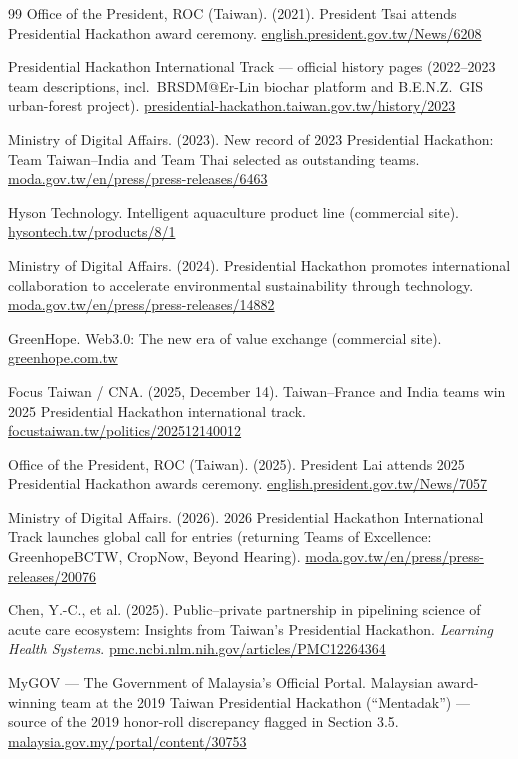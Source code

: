 \begin{thebibliography}{99}
 Office of the President, ROC (Taiwan). (2021). President
Tsai attends Presidential Hackathon award ceremony.
\href{https://english.president.gov.tw/News/6208}{english.president.gov.tw/News/6208}

 Presidential Hackathon International Track --- official
history pages (2022--2023 team descriptions, incl.\ BRSDM@Er-Lin biochar
platform and B.E.N.Z.\ GIS urban-forest project).
\href{https://presidential-hackathon.taiwan.gov.tw/history/2023/en/international-track/index.html}{presidential-hackathon.taiwan.gov.tw/history/2023}

 Ministry of Digital Affairs. (2023). New record of 2023
Presidential Hackathon: Team Taiwan--India and Team Thai selected as
outstanding teams.
\href{https://moda.gov.tw/en/press/press-releases/6463}{moda.gov.tw/en/press/press-releases/6463}

 Hyson Technology. Intelligent aquaculture product line
(commercial site).
\href{https://www.hysontech.tw/products/8/1}{hysontech.tw/products/8/1}

 Ministry of Digital Affairs. (2024). Presidential Hackathon
promotes international collaboration to accelerate environmental
sustainability through technology.
\href{https://moda.gov.tw/en/press/press-releases/14882}{moda.gov.tw/en/press/press-releases/14882}

 GreenHope. Web3.0: The new era of value exchange
(commercial site).
\href{https://www.greenhope.com.tw/}{greenhope.com.tw}

 Focus Taiwan / CNA. (2025, December 14). Taiwan--France
and India teams win 2025 Presidential Hackathon international track.
\href{https://focustaiwan.tw/politics/202512140012}{focustaiwan.tw/politics/202512140012}

 Office of the President, ROC (Taiwan). (2025). President
Lai attends 2025 Presidential Hackathon awards ceremony.
\href{https://english.president.gov.tw/News/7057}{english.president.gov.tw/News/7057}

 Ministry of Digital Affairs. (2026). 2026 Presidential
Hackathon International Track launches global call for entries (returning
Teams of Excellence: GreenhopeBCTW, CropNow, Beyond Hearing).
\href{https://moda.gov.tw/en/press/press-releases/20076}{moda.gov.tw/en/press/press-releases/20076}

 Chen, Y.-C., et al. (2025). Public--private partnership in
pipelining science of acute care ecosystem: Insights from Taiwan's
Presidential Hackathon. \emph{Learning Health Systems}.
\href{https://pmc.ncbi.nlm.nih.gov/articles/PMC12264364/}{pmc.ncbi.nlm.nih.gov/articles/PMC12264364}

 MyGOV --- The Government of Malaysia's Official Portal.
Malaysian award-winning team at the 2019 Taiwan Presidential Hackathon
(``Mentadak'') --- source of the 2019 honor-roll discrepancy flagged in
Section 3.5.
\href{https://www.malaysia.gov.my/portal/content/30753}{malaysia.gov.my/portal/content/30753}

\end{thebibliography}

